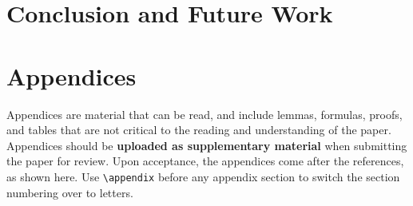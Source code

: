\documentclass[11pt,a4paper]{article}
\newcommand{\todo}[1]{\comment{Todo}{#1}}
\newcommand{\jer}[1]{\comment{Jeremy}{#1}}
\renewcommand{\comment}[2]{}
\begin{document}
\jer{It would be nice to show that the noise introduced by bilingual embeddings leads to LSTMs not being able to pick up on word order in the target language. We could train monolingual models for Spanish and Catalan and use the random reordering to see the difference.}

\todo{It would also be interesting to look at particular examples of errors that each model suffers. Are they different in each model? Is there any pattern?}

\section{Conclusion and Future Work}






\appendix

\section{Appendices}
\label{sec:appendix}
Appendices are material that can be read, and include lemmas, formulas, proofs, and tables that are not critical to the reading and understanding of the paper. 
Appendices should be {\bf uploaded as supplementary material} when submitting the paper for review. Upon acceptance, the appendices come after the references, as shown here. Use
\verb|\appendix| before any appendix section to switch the section
numbering over to letters.
\end{document}
